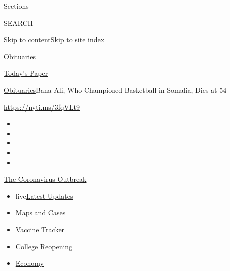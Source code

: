 Sections

SEARCH

\protect\hyperlink{site-content}{Skip to
content}\protect\hyperlink{site-index}{Skip to site index}

\href{https://www.nytimes.com/section/obituaries}{Obituaries}

\href{https://myaccount.nytimes.com/auth/login?response_type=cookie\&client_id=vi}{}

\href{https://www.nytimes.com/section/todayspaper}{Today's Paper}

\href{/section/obituaries}{Obituaries}\textbar{}Bana Ali, Who Championed
Basketball in Somalia, Dies at 54

\url{https://nyti.ms/3fqVLt9}

\begin{itemize}
\item
\item
\item
\item
\item
\end{itemize}

\href{https://www.nytimes.com/news-event/coronavirus?action=click\&pgtype=Article\&state=default\&region=TOP_BANNER\&context=storylines_menu}{The
Coronavirus Outbreak}

\begin{itemize}
\tightlist
\item
  live\href{https://www.nytimes.com/2020/08/03/world/coronavirus-covid-19.html?action=click\&pgtype=Article\&state=default\&region=TOP_BANNER\&context=storylines_menu}{Latest
  Updates}
\item
  \href{https://www.nytimes.com/interactive/2020/us/coronavirus-us-cases.html?action=click\&pgtype=Article\&state=default\&region=TOP_BANNER\&context=storylines_menu}{Maps
  and Cases}
\item
  \href{https://www.nytimes.com/interactive/2020/science/coronavirus-vaccine-tracker.html?action=click\&pgtype=Article\&state=default\&region=TOP_BANNER\&context=storylines_menu}{Vaccine
  Tracker}
\item
  \href{https://www.nytimes.com/2020/08/02/us/covid-college-reopening.html?action=click\&pgtype=Article\&state=default\&region=TOP_BANNER\&context=storylines_menu}{College
  Reopening}
\item
  \href{https://www.nytimes.com/live/2020/08/03/business/stock-market-today-coronavirus?action=click\&pgtype=Article\&state=default\&region=TOP_BANNER\&context=storylines_menu}{Economy}
\end{itemize}

